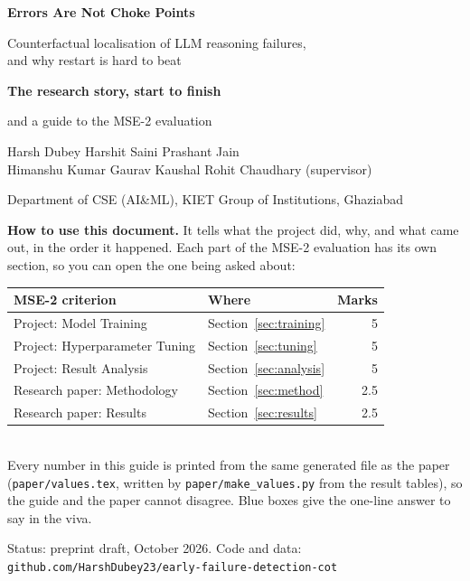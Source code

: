 \documentclass[11pt,a4paper]{article}
\begin{document}
\begin{titlepage}
\centering
\vspace*{2cm}
{\Huge\bfseries Errors Are Not Choke Points\par}
\vspace{0.4cm}
{\Large Counterfactual localisation of LLM reasoning failures,\\[2pt] and why restart is hard to beat\par}
\vspace{1.2cm}
{\Large\bfseries The research story, start to finish\par}
{\large and a guide to the MSE-2 evaluation\par}
\vspace{1.5cm}
{\large Harsh Dubey \quad Harshit Saini \quad Prashant Jain\\[2pt]
Himanshu Kumar \quad Gaurav Kaushal \quad Rohit Chaudhary (supervisor)\par}
\vspace{0.5cm}
{Department of CSE (AI\&ML), KIET Group of Institutions, Ghaziabad\par}
\vspace{1.5cm}
\begin{tcolorbox}[colback=acc!5,colframe=acc,width=0.9\textwidth]
\textbf{How to use this document.} It tells what the project did, why, and what came out, in the
order it happened. Each part of the MSE-2 evaluation has its own section, so you can open the one
being asked about:\\[4pt]
\begin{tabularx}{\linewidth}{lXr}
\toprule
MSE-2 criterion & Where & Marks\\\midrule
Project: Model Training & Section~\ref{sec:training} & 5\\
Project: Hyperparameter Tuning & Section~\ref{sec:tuning} & 5\\
Project: Result Analysis & Section~\ref{sec:analysis} & 5\\
Research paper: Methodology & Section~\ref{sec:method} & 2.5\\
Research paper: Results & Section~\ref{sec:results} & 2.5\\\bottomrule
\end{tabularx}\\[4pt]
Every number in this guide is printed from the same generated file as the paper
(\texttt{paper/values.tex}, written by \texttt{paper/make\_values.py} from the result tables), so
the guide and the paper cannot disagree. Blue boxes give the one-line answer to say in the viva.
\end{tcolorbox}
\vfill
{\small Status: preprint draft, October 2026. Code and data: \texttt{github.com/HarshDubey23/early-failure-detection-cot}}
\end{titlepage}
\end{document}
